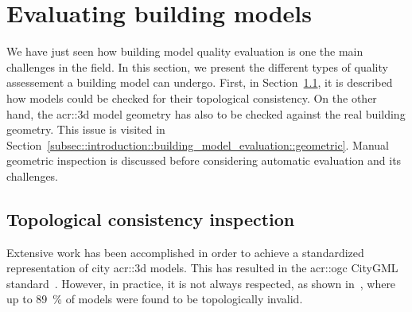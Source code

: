 \section{Evaluating building models}
    \label{sec::introduction::building_model_evaluation}
    We have just seen how building model quality evaluation is one the main challenges in the field.
    In this section, we present the different types of quality assessement a building model can undergo.
    First, in Section~\ref{subsec::introduction::building_model_evaluation::topological}, it is described how models could be checked for their topological consistency.
    On the other hand, the \gls{acr::3d} model geometry has also to be checked against the real building geometry.
    This issue is visited in Section~\ref{subsec::introduction::building_model_evaluation::geometric}.
    Manual geometric inspection is discussed before considering automatic evaluation and its challenges.

    \subsection{Topological consistency inspection}
        \label{subsec::introduction::building_model_evaluation::topological}
        Extensive work has been accomplished in order to achieve a standardized representation of city \gls{acr::3d} models.
        This has resulted in the \gls{acr::ogc} CityGML standard~\parencite{groger2012ogc}.
        However, in practice, it is not always respected, as shown in~\parencite{biljecki2016most}, where up to \SI{89}{\percent} of models were found to be topologically invalid.\\

